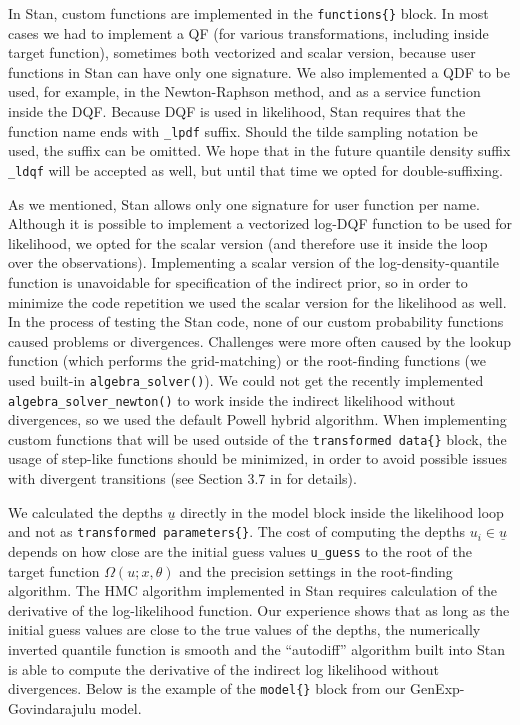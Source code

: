 \documentclass[ba]{imsart}
\numberwithin{equation}{section}
\theoremstyle{plain}
\begin{document}
In Stan, custom functions are implemented in the \texttt{functions\{\}} block. In most cases we had to implement a QF (for various transformations, including inside target function), sometimes both vectorized and scalar version, because user functions in Stan can have only one signature. We also implemented a QDF to be used, for example, in the Newton-Raphson method, and as a service function inside the DQF. Because DQF is used in likelihood, Stan requires that the function name ends with \texttt{\_lpdf} suffix. Should the tilde sampling notation be used, the suffix can be omitted. We hope that in the future quantile density suffix \texttt{\_ldqf} will be accepted as well, but until that time we opted for double-suffixing.

As we mentioned, Stan allows only one signature for user function per name. Although it is possible to implement a vectorized log-DQF function to be used for likelihood, we opted for the scalar version (and therefore use it inside the loop over the observations). Implementing a scalar version of the log-density-quantile function is unavoidable for specification of the indirect prior, so in order to minimize the code repetition we used the scalar version for the likelihood as well. In the process of testing the Stan code, none of our custom probability functions caused problems or divergences. Challenges were more often caused by the lookup function (which performs the grid-matching) or the root-finding functions (we used built-in \texttt{algebra\_solver()}). We could not get the recently implemented \texttt{algebra\_solver\_newton()} to work inside the indirect likelihood without divergences, so we used the default Powell hybrid algorithm. When implementing custom functions that will be used outside of the \texttt{transformed\ data\{\}} block, the usage of step-like functions should be minimized, in order to avoid possible issues with divergent transitions (see Section 3.7 in \citet{standevelopmentteam2021StanFunctionsReference} for details).

We calculated the depths \(\underline u\) directly in the model block inside the likelihood loop and not as \texttt{transformed\ parameters\{\}}. The cost of computing the depths \(u_i \in \underline u\) depends on how close are the initial guess values \texttt{u\_guess} to the root of the target function \(\Omega(u;x,\theta)\) and the precision settings in the root-finding algorithm. The HMC algorithm implemented in Stan requires calculation of the derivative of the log-likelihood function. Our experience shows that as long as the initial guess values are close to the true values of the depths, the numerically inverted quantile function is smooth and the ``autodiff'' algorithm built into Stan is able to compute the derivative of the indirect log likelihood without divergences. Below is the example of the \texttt{model\{\}} block from our GenExp-Govindarajulu model.
\end{document}

